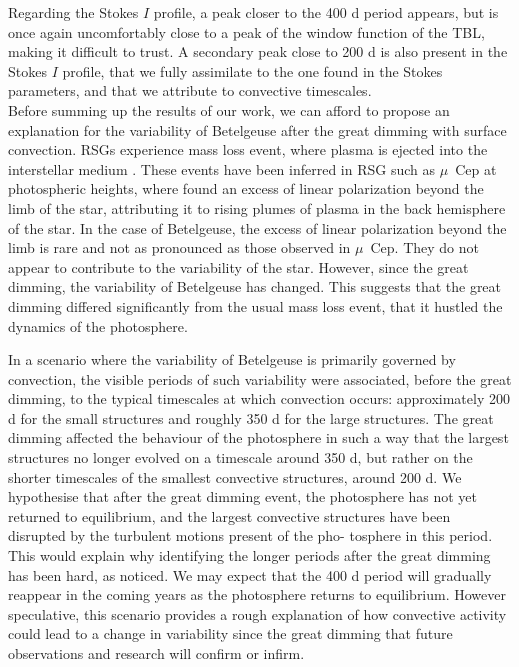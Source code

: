 \documentclass{aa}
\begin{document}
Regarding the Stokes $I$ profile, a peak closer to the 400 d period appears, but is once again uncomfortably close to a peak of the window function of the TBL, making it difficult to trust. A secondary peak close to 200 d is also present in the Stokes $I$ profile, that we fully assimilate to the one found in the Stokes parameters, and that we attribute to convective timescales.\\



Before summing up the results of our work, we can afford to propose an explanation for the variability of Betelgeuse after the great dimming with surface convection. RSGs experience mass loss event, where plasma is ejected into the interstellar medium \citep{josselin_atmospheric_2007}. These events have been inferred in RSG such as $\mu$~Cep at photospheric heights, where \cite{lopez_ariste_height_2023} found an excess of linear polarization beyond the limb of the star, attributing it to rising plumes of plasma in the back hemisphere of the star. In the case of Betelgeuse, the excess of linear polarization beyond the limb is rare and not as pronounced as those observed in $\mu$~Cep. They do not appear to contribute to the variability of the star. However, since the great dimming, the variability of Betelgeuse has changed. This suggests that the great dimming differed significantly from the usual mass loss event, that it hustled the dynamics of the photosphere. \

In a scenario where the variability of Betelgeuse is primarily governed by convection, the visible periods of such variability were associated, before the great dimming, to the typical timescales at which convection occurs: approximately 200 d for the small structures and roughly 350 d for the large structures. The great dimming affected the behaviour of the photosphere in
such a way that the largest structures no longer evolved on a
timescale around 350 d, but rather on the shorter timescales of
the smallest convective structures, around 200 d. We hypothesise that after the great dimming event, the photosphere has not
yet returned to equilibrium, and the largest convective structures
have been disrupted by the turbulent motions present of the pho-
tosphere in this period. This would explain why identifying the
longer periods after the great dimming has been hard, as \cite{dupree_great_2022} noticed. We may expect that the 400 d period will
gradually reappear in the coming years as the photosphere returns to equilibrium. However speculative, this scenario provides
a rough explanation of how convective activity could lead to a
change in variability since the great dimming that future observations and research will confirm or infirm.
\end{document}
